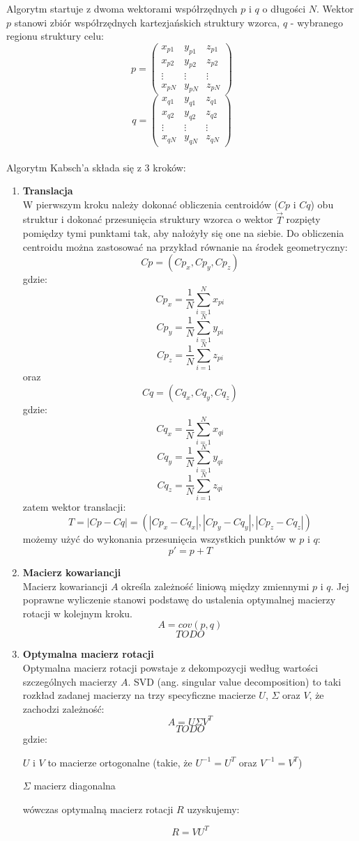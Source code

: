 \documentclass[licencjacka]{pracamgr}
\begin{document}
Algorytm startuje z dwoma wektorami współrzędnych $p$ i $q$ o długości $N$. Wektor $p$ stanowi zbiór współrzędnych kartezjańskich struktury wzorca, $q$ - wybranego regionu struktury celu:
$$
p=
\begin{pmatrix}
 x_{p1} & y_{p1} & z_{p1} \\
 x_{p2} & y_{p2} & z_{p2} \\
 \vdots & \vdots & \vdots \\
 x_{pN} & y_{pN} & z_{pN}
\end{pmatrix}
$$
$$
q= 
\begin{pmatrix}
 x_{q1} & y_{q1} & z_{q1} \\
 x_{q2} & y_{q2} & z_{q2} \\
 \vdots & \vdots & \vdots \\
 x_{qN} & y_{qN} & z_{qN}
\end{pmatrix}
$$
\\
Algorytm Kabsch'a składa się z 3 kroków:
\begin{enumerate}
\item \textbf{Translacja} \\
W pierwszym kroku należy dokonać obliczenia centroidów ($Cp$ i $Cq$) obu struktur i dokonać przesunięcia struktury wzorca o wektor $\vec{T}$ rozpięty pomiędzy tymi punktami tak, aby nałożyły się one na siebie. Do obliczenia centroidu można zastosować na przykład równanie na środek geometryczny: 
$$Cp = (Cp_x, Cp_y, Cp_z)$$
gdzie:
$$Cp_x = \frac{1}{N}\sum_{i=1}^{N}{x_{pi}}$$
$$Cp_y = \frac{1}{N}\sum_{i=1}^{N}{y_{pi}}$$
$$Cp_z = \frac{1}{N}\sum_{i=1}^{N}{z_{pi}}$$
oraz
$$Cq = (Cq_x, Cq_y, Cq_z)$$
gdzie:
$$Cq_x = \frac{1}{N}\sum_{i=1}^{N}{x_{qi}}$$
$$Cq_y = \frac{1}{N}\sum_{i=1}^{N}{y_{qi}}$$
$$Cq_z = \frac{1}{N}\sum_{i=1}^{N}{z_{qi}}$$
zatem wektor translacji:
$$ T = |Cp-Cq| =(|Cp_x-Cq_x|,|Cp_y-Cq_y|,|Cp_z-Cq_z|)$$
możemy użyć do wykonania przesunięcia wszystkich punktów w $p$ i $q$:
$$p'=p+T$$
\item \textbf{Macierz kowariancji} \\
Macierz kowariancji $A$ określa zależność liniową między zmiennymi $p$ i $q$. Jej poprawne wyliczenie stanowi podstawę do ustalenia optymalnej macierzy rotacji w kolejnym kroku.
$$ 
A=cov(p,q)
$$
$$
 TODO
$$

\item \textbf{Optymalna macierz rotacji} \\
Optymalna macierz rotacji powstaje z dekompozycji według wartości szczególnych macierzy $A$. SVD (ang. singular value decomposition) to taki rozkład zadanej macierzy na trzy specyficzne macierze $U$, $\Sigma$ oraz $V$, że zachodzi zależność:
$$
A=U \Sigma V^T
$$
$$
 TODO
$$
gdzie:

\quad$U$ i $V$ to macierze ortogonalne (takie, że $U^{-1}=U^{T}$ oraz $V^{-1}=V^{T}$)

\quad$\Sigma$ macierz diagonalna

wówczas optymalną macierz rotacji $R$ uzyskujemy:

$$R=VU^T$$

\end{enumerate}
\end{document}

